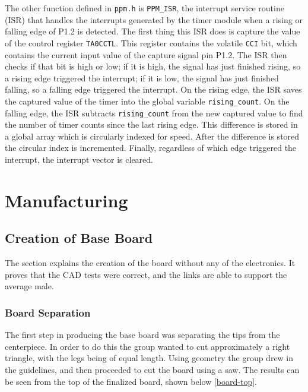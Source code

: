 \documentclass[letterpaper,12pt]{article}
\begin{document}
The other function defined in \texttt{ppm.h} is \texttt{PPM\_ISR}, the interrupt service routine (ISR) that handles the interrupts generated by the timer module when a rising or falling edge of P1.2 is detected. The first thing this ISR does is capture the value of the control register \texttt{TA0CCTL}. This register contains the volatile \texttt{CCI} bit, which contains the current input value of the capture signal pin P1.2. The ISR then checks if that bit is high or low; if it is high, the signal has just finished rising, so a rising edge triggered the interrupt; if it is low, the signal has just finished falling, so a falling edge triggered the interrupt. On the rising edge, the ISR saves the captured value of the timer into the global variable \texttt{rising\_count}. On the falling edge, the ISR subtracts \texttt{rising\_count} from the new captured value to find the number of timer counts since the last rising edge. This difference is stored in a global array which is circularly indexed for speed. After the difference is stored the circular index is incremented. Finally, regardless of which edge triggered the interrupt, the interrupt vector is cleared.

\section{Manufacturing}
\subsection{Creation of Base Board}
The section explains the creation of the board without any of the electronics. It proves that the CAD tests were correct, and the links are able to support the average male.
\subsubsection{Board Separation}
The first step in producing the base board was separating the tips from the centerpiece. In order to do this the group wanted to cut approximately a right triangle, with the legs being of equal length. Using geometry the group drew in the guidelines, and then proceeded to cut the board using a saw. The results can be seen from the top of the finalized board, shown below \ref{board-top}.
\end{document}
